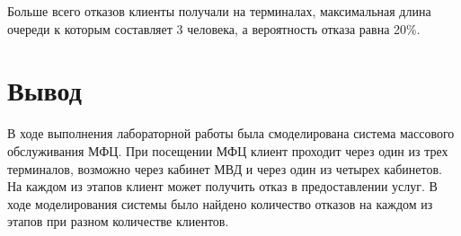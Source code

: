 \documentclass[a4paper,fontsize=12bp]{extreport}
\begin{document}
Больше всего отказов клиенты получали на терминалах, максимальная длина очереди к которым составляет 3 человека, а вероятность отказа равна 20\%.

\section*{Вывод}
В ходе выполнения лабораторной работы была смоделирована система массового обслуживания МФЦ. При посещении МФЦ клиент проходит через один из трех терминалов, возможно через кабинет МВД и через один из четырех кабинетов. На каждом из этапов клиент может получить отказ в предоставлении услуг.  В ходе моделирования системы было найдено количество отказов на каждом из этапов при разном количестве клиентов.
\end{document}
